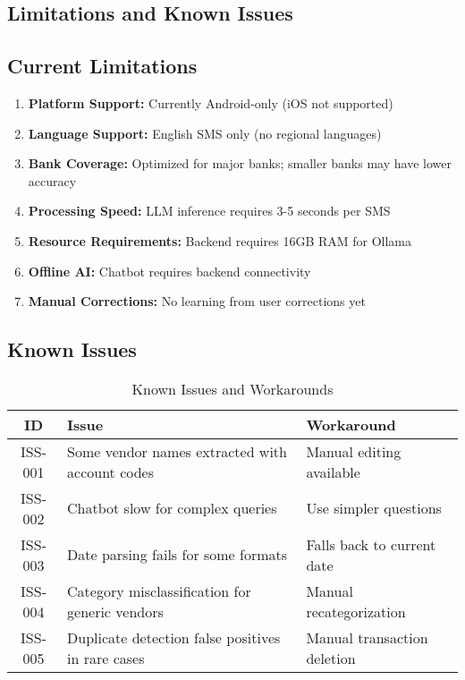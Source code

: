 \documentclass[11pt,a4paper]{report}
\begin{document}
\begin{itemize}
\begin{itemize}
\section{Limitations and Known Issues}

\subsection{Current Limitations}

\begin{enumerate}
    \item \textbf{Platform Support:} Currently Android-only (iOS not supported)
    \item \textbf{Language Support:} English SMS only (no regional languages)
    \item \textbf{Bank Coverage:} Optimized for major banks; smaller banks may have lower accuracy
    \item \textbf{Processing Speed:} LLM inference requires 3-5 seconds per SMS
    \item \textbf{Resource Requirements:} Backend requires 16GB RAM for Ollama
    \item \textbf{Offline AI:} Chatbot requires backend connectivity
    \item \textbf{Manual Corrections:} No learning from user corrections yet
\end{enumerate}

\subsection{Known Issues}

\begin{table}[H]
\centering
\caption{Known Issues and Workarounds}
\begin{tabular}{|c|p{6cm}|p{5cm}|}
\hline
\textbf{ID} & \textbf{Issue} & \textbf{Workaround} \\
\hline
ISS-001 & Some vendor names extracted with account codes & Manual editing available \\
ISS-002 & Chatbot slow for complex queries & Use simpler questions \\
ISS-003 & Date parsing fails for some formats & Falls back to current date \\
ISS-004 & Category misclassification for generic vendors & Manual recategorization \\
ISS-005 & Duplicate detection false positives in rare cases & Manual transaction deletion \\
\hline
\end{tabular}
\end{table}


\end{itemize}
\end{itemize}
\end{document}
